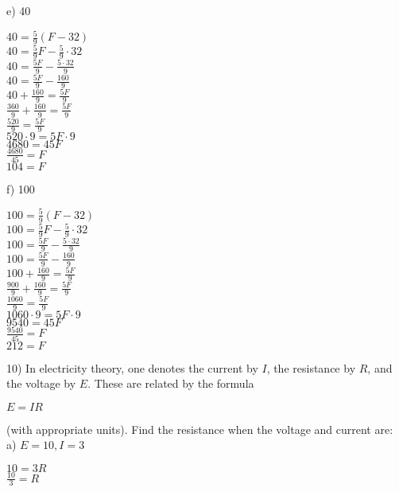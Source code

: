 \documentclass[12pt]{article}
\begin{document}
e) 40
\begin{center}
$40=\displaystyle \frac{5}{9}(F-32)$ \\
$40=\displaystyle \frac{5}{9}F-\displaystyle \frac{5}{9}\cdot32$ \\
$40=\displaystyle \frac{5F}{9}-\displaystyle \frac{5\cdot32}{9}$ \\
$40=\displaystyle \frac{5F}{9}-\displaystyle \frac{160}{9}$ \\
$40+\displaystyle \frac{160}{9}=\displaystyle \frac{5F}{9}$ \\
$\displaystyle \frac{360}{9}+\displaystyle \frac{160}{9}=\displaystyle \frac{5F}{9}$ \\
$\displaystyle \frac{520}{9}=\displaystyle \frac{5F}{9}$ \\
$520\cdot9=5F\cdot9$ \\
$4680=45F$ \\
$\displaystyle \frac{4680}{45}=F$ \\
$104=F$
\end{center}
f) 100
\begin{center}
$100=\displaystyle \frac{5}{9}(F-32)$ \\
$100=\displaystyle \frac{5}{9}F-\displaystyle \frac{5}{9}\cdot32$ \\
$100=\displaystyle \frac{5F}{9}-\displaystyle \frac{5\cdot32}{9}$ \\
$100=\displaystyle \frac{5F}{9}-\displaystyle \frac{160}{9}$ \\
$100+\displaystyle \frac{160}{9}=\displaystyle \frac{5F}{9}$ \\
$\displaystyle \frac{900}{9}+\displaystyle \frac{160}{9}=\displaystyle \frac{5F}{9}$ \\
$\displaystyle \frac{1060}{9}=\displaystyle \frac{5F}{9}$ \\
$1060\cdot9=5F\cdot9$ \\
$9540=45F$ \\
$\displaystyle \frac{9540}{45}=F$ \\
$212=F$
\end{center}
10) In electricity theory, one denotes the current by $I$, the resistance by $R$, and the voltage by $E$. These are related by the formula
\begin{center}
$E=IR$
\end{center}
(with appropriate units). Find the resistance when the voltage and current are: \\
a) $E=10, I=3$
\begin{center}
$10=3R$ \\
$\displaystyle \frac{10}{3}=R$
\end{center}
\end{document}
